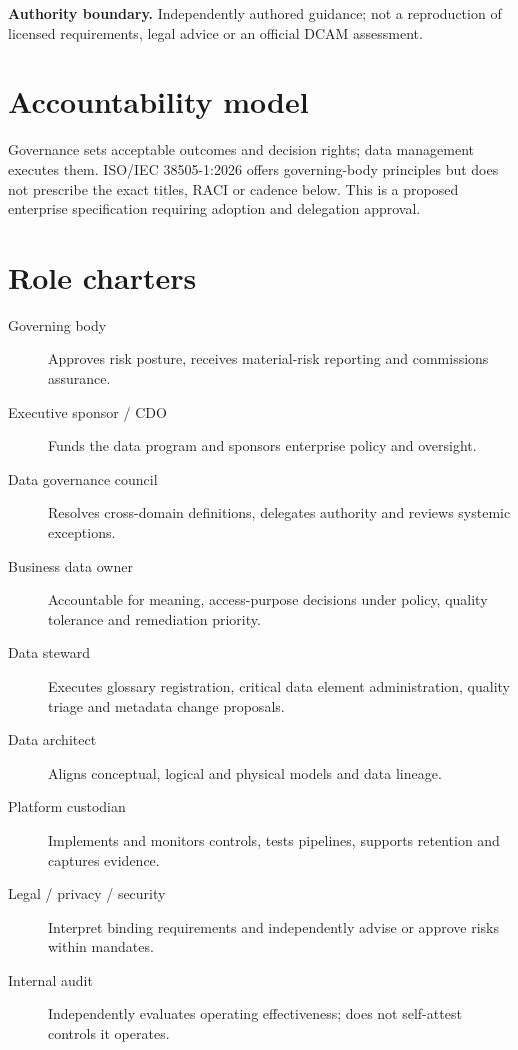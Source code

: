 \documentclass[11pt,letterpaper]{article}
\begin{document}
\makedoctitle
\makedocsummary
\noindent\textbf{Authority boundary.} Independently authored guidance; not a reproduction of licensed requirements, legal advice or an official DCAM assessment.
\section{Accountability model}
Governance sets acceptable outcomes and decision rights; data management executes them. ISO/IEC 38505-1:2026 offers governing-body principles but does not prescribe the exact titles, RACI or cadence below. This is a proposed enterprise specification requiring adoption and delegation approval.

\section{Role charters}
\begin{description}
\item[Governing body] Approves risk posture, receives material-risk reporting and commissions assurance.
\item[Executive sponsor / CDO] Funds the data program and sponsors enterprise policy and oversight.
\item[Data governance council] Resolves cross-domain definitions, delegates authority and reviews systemic exceptions.
\item[Business data owner] Accountable for meaning, access-purpose decisions under policy, quality tolerance and remediation priority.
\item[Data steward] Executes glossary registration, critical data element administration, quality triage and metadata change proposals.
\item[Data architect] Aligns conceptual, logical and physical models and data lineage.
\item[Platform custodian] Implements and monitors controls, tests pipelines, supports retention and captures evidence.
\item[Legal / privacy / security] Interpret binding requirements and independently advise or approve risks within mandates.
\item[Internal audit] Independently evaluates operating effectiveness; does not self-attest controls it operates.
\end{description}
\end{document}

